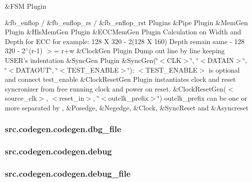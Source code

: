 \&F\-S\-M Plugin 

\&fb\-\_\-enflop / \&fb\-\_\-enflop\-\_\-rs / \&fb\-\_\-enflop\-\_\-rst Plugins \&Pipe Plugin \&Mem\-Gen Plugin \&Hls\-Mem\-Gen Plugin \&E\-C\-C\-Mem\-Gen Plugin Calculation on Width and Depth for E\-C\-C for example\-: 128 X 320 -\/ 2(128 X 160) Depth remain same -\/ 128 320 -\/ 2$^\wedge$(r-\/1) $>$= r+w \&Clock\-Gen Plugin Dump out line by line keeping U\-S\-E\-R's indentation \&Sync\-Gen Plugin \&Sync\-Gen(\char`\"{}$<$\-C\-L\-K$>$\char`\"{}, \char`\"{}$<$\-D\-A\-T\-A\-I\-N$>$\char`\"{}, \char`\"{}$<$\-D\-A\-T\-A\-O\-U\-T\char`\"{}, \char`\"{}$<$\-T\-E\-S\-T\-\_\-\-E\-N\-A\-B\-L\-E$>$\char`\"{}); $<$\-T\-E\-S\-T\-\_\-\-E\-N\-A\-B\-L\-E$>$ is optional and connect test\-\_\-enable \&Clock\-Reset\-Gen Plugin instantiates clock and reset syncronizer from free running clock and power on reset. \&Clock\-Reset\-Gen($<$source\-\_\-clk$>$, $<$reset\-\_\-in$>$, \char`\"{}$<$outclk\-\_\-prefix$>$\char`\"{}) outclk\-\_\-prefix can be one or more separated by , \&Posedge, \&Negedge, \&Clock, \&Sync\-Reset and \&Asyncreset \hypertarget{classsrc_1_1codegen_1_1codegen_ab37d0cfef8135e7c4be46e1592a8ca06}{
\subsubsection[{dbg\-\_\-file}]{\setlength{\rightskip}{0pt plus 5cm}src.\-codegen.\-codegen.\-dbg\-\_\-file}}\label{classsrc_1_1codegen_1_1codegen_ab37d0cfef8135e7c4be46e1592a8ca06}
\hypertarget{classsrc_1_1codegen_1_1codegen_a1dc7058a4be04c25dbeda35f53ad6561}{
\subsubsection[{debug}]{\setlength{\rightskip}{0pt plus 5cm}src.\-codegen.\-codegen.\-debug}}\label{classsrc_1_1codegen_1_1codegen_a1dc7058a4be04c25dbeda35f53ad6561}
\hypertarget{classsrc_1_1codegen_1_1codegen_a7b9958156cd5e9db7a5065e37d8c2e3e}{
\subsubsection[{debug\-\_\-file}]{\setlength{\rightskip}{0pt plus 5cm}src.\-codegen.\-codegen.\-debug\-\_\-file}}\label{classsrc_1_1codegen_1_1codegen_a7b9958156cd5e9db7a5065e37d8c2e3e}
